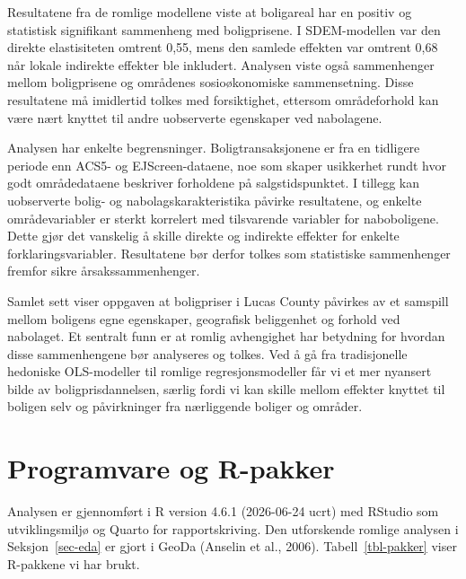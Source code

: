 \documentclass[
  norsk,
  a4paper,
]{article}
\begin{document}
Resultatene fra de romlige modellene viste at boligareal har en positiv
og statistisk signifikant sammenheng med boligprisene. I SDEM-modellen
var den direkte elastisiteten omtrent 0,55, mens den samlede effekten
var omtrent 0,68 når lokale indirekte effekter ble inkludert. Analysen
viste også sammenhenger mellom boligprisene og områdenes sosioøkonomiske
sammensetning. Disse resultatene må imidlertid tolkes med forsiktighet,
ettersom områdeforhold kan være nært knyttet til andre uobserverte
egenskaper ved nabolagene.

Analysen har enkelte begrensninger. Boligtransaksjonene er fra en
tidligere periode enn ACS5- og EJScreen-dataene, noe som skaper
usikkerhet rundt hvor godt områdedataene beskriver forholdene på
salgstidspunktet. I tillegg kan uobserverte bolig- og
nabolagskarakteristika påvirke resultatene, og enkelte områdevariabler
er sterkt korrelert med tilsvarende variabler for naboboligene. Dette
gjør det vanskelig å skille direkte og indirekte effekter for enkelte
forklaringsvariabler. Resultatene bør derfor tolkes som statistiske
sammenhenger fremfor sikre årsakssammenhenger.

Samlet sett viser oppgaven at boligpriser i Lucas County påvirkes av et
samspill mellom boligens egne egenskaper, geografisk beliggenhet og
forhold ved nabolaget. Et sentralt funn er at romlig avhengighet har
betydning for hvordan disse sammenhengene bør analyseres og tolkes. Ved
å gå fra tradisjonelle hedoniske OLS-modeller til romlige
regresjonsmodeller får vi et mer nyansert bilde av boligprisdannelsen,
særlig fordi vi kan skille mellom effekter knyttet til boligen selv og
påvirkninger fra nærliggende boliger og områder.

\section{Programvare og R-pakker}\label{programvare-og-r-pakker}

Analysen er gjennomført i R version 4.6.1 (2026-06-24 ucrt) med RStudio
som utviklingsmiljø og Quarto for rapportskriving. Den utforskende
romlige analysen i Seksjon~\ref{sec-eda} er gjort i GeoDa (Anselin et
al., 2006). Tabell~\ref{tbl-pakker} viser R-pakkene vi har brukt.
\end{document}
